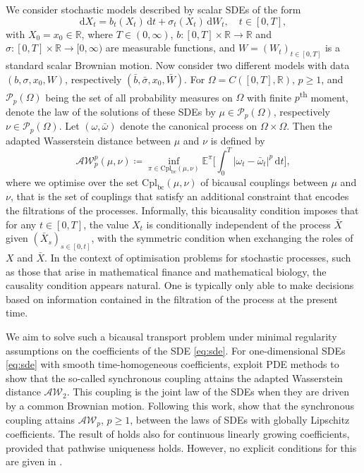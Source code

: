 \documentclass[onseside, final]{amsart}
\theoremstyle{definition}
\newcommand{\Pc}{\mathcal P}
\newcommand{\R}{\mathbb R}
\newcommand{\E}{\mathbb E}
\newcommand{\D}{\,\mathrm{d}}
\newcommand{\ds}{\mathrm{d}}
\newcommand{\AW}{\mathcal A\mathcal W}
\newcommand{\cpl}{\mathrm{Cpl}}
\newcommand{\cplba}{\cpl_{\mathrm{bc}}}
\numberwithin{equation}{section}
\begin{document}
	We consider stochastic models described by scalar SDEs of the form
		\begin{equation}\label{eq:sde}
			\ds X_t = b_t(X_t) \D t + \sigma_t(X_t) \D W_t, \quad t \in [0, T],
		\end{equation}
	with $X_0 = x_0 \in \R$, where $T \in (0, \infty)$, $b \colon [0, T] \times \R \to \R$ and $\sigma \colon [0, T] \times \R \to [0, \infty)$ are measurable functions, and $W=(W_t)_{t\in[0,T]}$ is a standard scalar Brownian motion.
	Now consider two different models with data $(b,\sigma,x_0,W)$, respectively $(\bar b, \bar \sigma,x_0,\bar W)$.
	For $\Omega = C([0, T], \R)$, $p\ge 1$, and $\Pc_p(\Omega)$ being the set of all probability measures on $\Omega$ with finite $p$\textsuperscript{th} moment, denote the law of the solutions of these SDEs by $\mu \in \Pc_p(\Omega)$, respectively $\nu \in \Pc_p(\Omega)$. Let $(\omega, \bar \omega)$ denote the canonical process on $\Omega \times \Omega$.
	Then the adapted Wasserstein distance between $\mu$ and $\nu$ is defined by
	\begin{equation}
		\AW_p^p(\mu, \nu) \coloneqq \inf_{\pi \in \cplba(\mu, \nu)}\E^\pi\biggl[\int_0^T |\omega_t - \bar \omega_t |^p \D t\biggr],
	\end{equation}
	where we optimise over the set $\cplba(\mu, \nu)$ of bicausal couplings between $\mu$ and $\nu$, that is the set of couplings that satisfy an additional constraint that encodes the filtrations of the processes. Informally, this bicausality condition imposes that for any $t \in [0, T]$, the value $X_t$ is conditionally independent of the process $\bar X$ given $(\bar X_s)_{s \in [0, t]}$, with the symmetric condition when exchanging the roles of $X$ and $\bar X$. In the context of optimisation problems for stochastic processes, such as those that arise in mathematical finance and mathematical biology, the causality condition appears natural. One is typically only able to make decisions based on information contained in the filtration of the process at the present time.
	
	We aim to solve such a bicausal transport problem under minimal regularity assumptions on the coefficients of the SDE \eqref{eq:sde}.
	For one-dimensional SDEs \eqref{eq:sde} with smooth time-homogeneous coefficients, \citet[\S 2.1]{BiTa19} exploit PDE methods to show that the so-called synchronous coupling attains the adapted Wasserstein distance $\AW_2$. This coupling is the joint law of the SDEs when they are driven by a common Brownian motion. Following this work, \citet[Theorem 1.3]{BaKaRo22} show that the synchronous coupling attains $\AW_p$, $p \ge 1$, between the laws of SDEs with globally Lipschitz coefficients. The result of \citep{BaKaRo22} holds also for continuous linearly growing coefficients, provided that pathwise uniqueness holds. However, no explicit conditions for this are given in \cite{BaKaRo22}.
	
\end{document}
